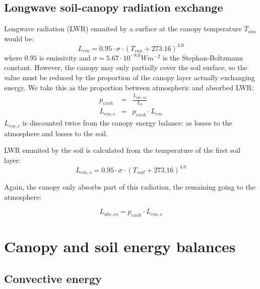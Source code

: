 \documentclass[]{book}
\begin{document}
\hypertarget{longwave-soil-canopy-radiation-exchange}{%
\section{Longwave soil-canopy radiation exchange}\label{longwave-soil-canopy-radiation-exchange}}

Longwave radiation (LWR) emmited by a surface at the canopy temperature \(T_{can}\) would be:
\begin{equation}
L_{em} = 0.95 \cdot \sigma \cdot (T_{can} + 273.16)^{4.0}
\end{equation}
where \(0.95\) is emissivity and \(\sigma = 5.67 \cdot 10^{-8.0} Wm^{-2}\) is the Stephan-Boltzmann constant. However, the canopy may only partially cover the soil surface, so the value must be reduced by the proportion of the canopy layer actually exchanging energy. We take this as the proportion between atmospheric and absorbed LWR:
\begin{eqnarray}
p_{exch} &=& \frac{L_{abs,ca}}{L_a} \\
L_{em, c} &=& p_{exch} \cdot L_{em}
\end{eqnarray}
\(L_{em, c}\) is discounted twice from the canopy energy balance: as losses to the atmosphere and losses to the soil.

LWR emmited by the soil is calculated from the temperature of the first soil layer:
\begin{equation}
L_{em, s} = 0.95 \cdot \sigma \cdot (T_{soil} + 273.16)^{4.0}
\end{equation}

Again, the canopy only absorbs part of this radiation, the remaining going to the atmosphere:

\begin{equation}
L_{abs, cs} = p_{exch} \cdot L_{em,s}
\end{equation}

\hypertarget{canopy-and-soil-energy-balances}{%
\chapter{Canopy and soil energy balances}\label{canopy-and-soil-energy-balances}}

\hypertarget{convective-energy}{%
\section{Convective energy}\label{convective-energy}}
\end{document}
